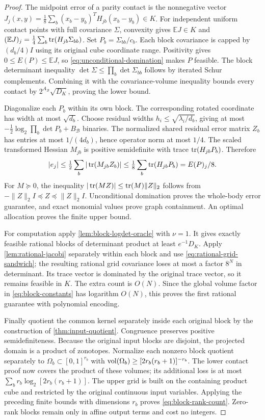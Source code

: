 \begin{proof}
The midpoint error of a parity contact is the nonnegative vector
$J_j(x,y)=\frac18\sum_b(x_b-y_b)^TH_{jb}(x_b-y_b)\in K$.
For independent uniform contact points with full covariance $\Sigma$,
convexity gives $\mathbb EJ\in K$ and
$(\mathbb EJ)_j=\frac14\sum_b\operatorname{tr}(H_{jb}\Sigma_{bb})$.
Set $P_b=\Sigma_{bb}/c_b$. Each block covariance is capped by
$(d_b/4)I$ using its original cube coordinate range. Positivity gives
$0\le E(P)\le\mathbb EJ$, so \eqref{eq:unconditional-domination}
makes $P$ feasible. The block determinant inequality
$\det\Sigma\le\prod_b\det\Sigma_{bb}$ follows by iterated Schur
complements. Combining it with the covariance-volume inequality bounds
every contact by $2^{A_{\mathcal B}}\sqrt{D_K}$, proving the lower bound.

Diagonalize each $P_b$ within its own block. The corresponding rotated
coordinate has width at most $\sqrt{d_b}$. Choose residual widths
$h_i\le\sqrt{\lambda_i/d_b}$, giving at most
$-\frac12\log_2\prod_b\det P_b+B_{\mathcal B}$ binaries. The normalized
shared residual error matrix $Z_b$ has entries at most $1/(4d_b)$,
hence operator norm at most $1/4$. The scaled transformed Hessian
$M_{jb}$ is positive semidefinite with trace $\operatorname{tr}(H_{jb}P_b)$. Therefore
\[
 |e_j|\le\tfrac12\sum_b|\operatorname{tr}(M_{jb}Z_b)|
 \le\tfrac18\sum_b\operatorname{tr}(H_{jb}P_b)=E(P)_j/8.
\]
For $M\succeq0$, the inequality $|\operatorname{tr}(MZ)|\le\operatorname{tr}(M)\|Z\|_2$ follows
from $-\|Z\|_2I\preceq Z\preceq\|Z\|_2I$. Unconditional domination
proves the whole-body error guarantee, and exact monomial values prove
graph containment. An optimal allocation proves the finite upper bound.

For computation apply \cref{lem:block-logdet-oracle} with $\nu=1$.
It gives exactly feasible rational blocks of determinant product at
least $e^{-1}D_K$. Apply \cref{lem:rational-jacobi} separately within
each block and use \eqref{eq:rational-grid-sandwich}; the resulting
rational grid covariance loses at most a factor $8^N$ in determinant.
Its trace vector is dominated by the original trace vector, so it remains
feasible in $K$. The extra count is $O(N)$. Since the global volume
factor in \eqref{eq:block-constants} has logarithm $O(N)$, this proves
the first rational guarantee with polynomial encoding.

Finally quotient the common kernel separately inside each original
block by the construction of \cref{thm:input-quotient}. Congruence
preserves positive semidefiniteness. Because the original input blocks
are disjoint, the projected domain is a product of zonotopes. Normalize
each nonzero block quotient separately to
$\Omega_b\subset[0,1]^{r_b}$ with
$\operatorname{vol}(\Omega_b)\ge[2r_b(r_b+1)]^{-r_b}$. The lower contact proof now
covers the product of these volumes; its additional loss is at most
$\sum_br_b\log_2[2r_b(r_b+1)]$. The upper grid is built on the
containing product cube and restricted by the original continuous input
variables. Applying the preceding finite bounds with dimensions $r_b$
proves \eqref{eq:block-rank-count}. Zero-rank blocks remain only in
affine output terms and cost no integers.
\end{proof}

